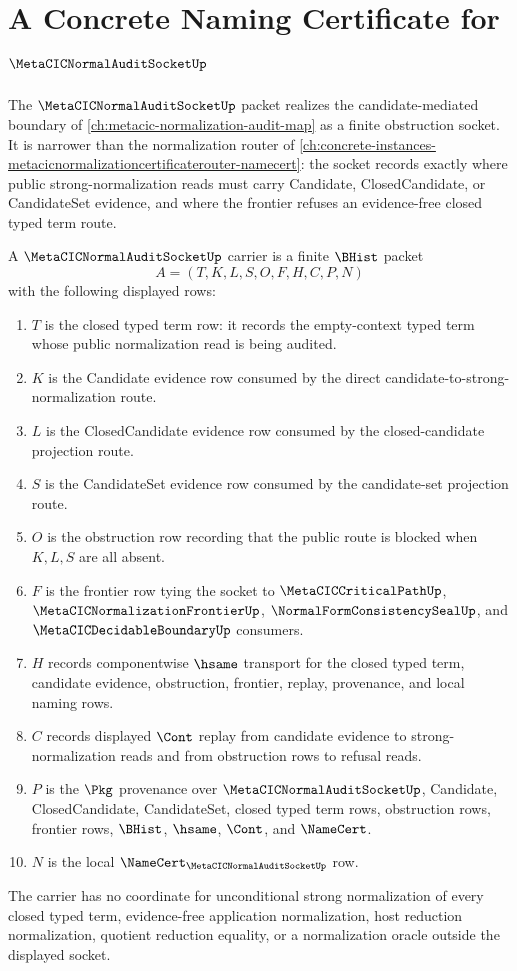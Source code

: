 \chapter{A Concrete Naming Certificate for $\MetaCICNormalAuditSocketUp$}
\label{ch:concrete-instances-metacic-normal-audit-socket-namecert}

The $\MetaCICNormalAuditSocketUp$ packet realizes the candidate-mediated boundary of \autoref{ch:metacic-normalization-audit-map} as a finite obstruction socket. It is narrower than the normalization router of \autoref{ch:concrete-instances-metacicnormalizationcertificaterouter-namecert}: the socket records exactly where public strong-normalization reads must carry Candidate, ClosedCandidate, or CandidateSet evidence, and where the frontier refuses an evidence-free closed typed term route.

\begin{definition}
\label{def:metacic-normal-audit-socket-carrier}
A $\MetaCICNormalAuditSocketUp$ carrier is a finite $\BHist$ packet
$$
A=(T,K,L,S,O,F,H,C,P,N)
$$
with the following displayed rows:
\begin{enumerate}
\item $T$ is the closed typed term row: it records the empty-context typed term whose public normalization read is being audited.
\item $K$ is the Candidate evidence row consumed by the direct candidate-to-strong-normalization route.
\item $L$ is the ClosedCandidate evidence row consumed by the closed-candidate projection route.
\item $S$ is the CandidateSet evidence row consumed by the candidate-set projection route.
\item $O$ is the obstruction row recording that the public route is blocked when $K,L,S$ are all absent.
\item $F$ is the frontier row tying the socket to $\MetaCICCriticalPathUp$, $\MetaCICNormalizationFrontierUp$, $\NormalFormConsistencySealUp$, and $\MetaCICDecidableBoundaryUp$ consumers.
\item $H$ records componentwise $\hsame$ transport for the closed typed term, candidate evidence, obstruction, frontier, replay, provenance, and local naming rows.
\item $C$ records displayed $\Cont$ replay from candidate evidence to strong-normalization reads and from obstruction rows to refusal reads.
\item $P$ is the $\Pkg$ provenance over $\MetaCICNormalAuditSocketUp$, Candidate, ClosedCandidate, CandidateSet, closed typed term rows, obstruction rows, frontier rows, $\BHist$, $\hsame$, $\Cont$, and $\NameCert$.
\item $N$ is the local $\NameCert_{\MetaCICNormalAuditSocketUp}$ row.
\end{enumerate}
The carrier has no coordinate for unconditional strong normalization of every closed typed term, evidence-free application normalization, host reduction normalization, quotient reduction equality, or a normalization oracle outside the displayed socket.
\end{definition}

